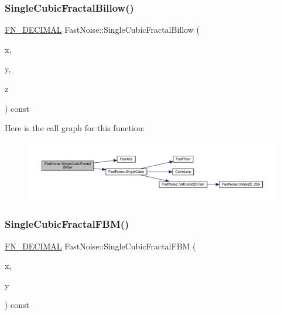 \subsubsection{\texorpdfstring{Single\+Cubic\+Fractal\+Billow()}{SingleCubicFractalBillow()}\hspace{0.1cm}{\footnotesize\ttfamily [2/2]}}
{\footnotesize\ttfamily \mbox{\hyperlink{_fast_noise_8h_a75a9ef6d2541c4921815b885bfd449c3}{F\+N\+\_\+\+D\+E\+C\+I\+M\+AL}} Fast\+Noise\+::\+Single\+Cubic\+Fractal\+Billow (\begin{DoxyParamCaption}\item[{\mbox{\hyperlink{_fast_noise_8h_a75a9ef6d2541c4921815b885bfd449c3}{F\+N\+\_\+\+D\+E\+C\+I\+M\+AL}}}]{x,  }\item[{\mbox{\hyperlink{_fast_noise_8h_a75a9ef6d2541c4921815b885bfd449c3}{F\+N\+\_\+\+D\+E\+C\+I\+M\+AL}}}]{y,  }\item[{\mbox{\hyperlink{_fast_noise_8h_a75a9ef6d2541c4921815b885bfd449c3}{F\+N\+\_\+\+D\+E\+C\+I\+M\+AL}}}]{z }\end{DoxyParamCaption}) const\hspace{0.3cm}{\ttfamily [private]}}

Here is the call graph for this function\+:
\nopagebreak
\begin{figure}[H]
\begin{center}
\leavevmode
\includegraphics[width=350pt]{class_fast_noise_a8595f37169b6133ccd822d21af3acd60_cgraph}
\end{center}
\end{figure}
\mbox{\label{class_fast_noise_a892cdc836d7704acfbf8c3680a1a2689}} 
\subsubsection{\texorpdfstring{Single\+Cubic\+Fractal\+F\+B\+M()}{SingleCubicFractalFBM()}\hspace{0.1cm}{\footnotesize\ttfamily [1/2]}}
{\footnotesize\ttfamily \mbox{\hyperlink{_fast_noise_8h_a75a9ef6d2541c4921815b885bfd449c3}{F\+N\+\_\+\+D\+E\+C\+I\+M\+AL}} Fast\+Noise\+::\+Single\+Cubic\+Fractal\+F\+BM (\begin{DoxyParamCaption}\item[{\mbox{\hyperlink{_fast_noise_8h_a75a9ef6d2541c4921815b885bfd449c3}{F\+N\+\_\+\+D\+E\+C\+I\+M\+AL}}}]{x,  }\item[{\mbox{\hyperlink{_fast_noise_8h_a75a9ef6d2541c4921815b885bfd449c3}{F\+N\+\_\+\+D\+E\+C\+I\+M\+AL}}}]{y }\end{DoxyParamCaption}) const\hspace{0.3cm}{\ttfamily [private]}}

